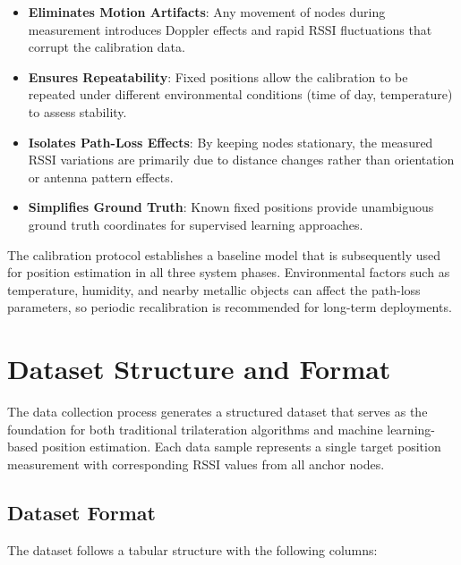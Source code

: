 \begin{itemize}
    \item \textbf{Eliminates Motion Artifacts}: Any movement of nodes during measurement introduces Doppler effects and rapid RSSI fluctuations that corrupt the calibration data.
    
    \item \textbf{Ensures Repeatability}: Fixed positions allow the calibration to be repeated under different environmental conditions (time of day, temperature) to assess stability.
    
    \item \textbf{Isolates Path-Loss Effects}: By keeping nodes stationary, the measured RSSI variations are primarily due to distance changes rather than orientation or antenna pattern effects.
    
    \item \textbf{Simplifies Ground Truth}: Known fixed positions provide unambiguous ground truth coordinates for supervised learning approaches.
\end{itemize}

The calibration protocol establishes a baseline model that is subsequently used for position estimation in all three system phases. Environmental factors such as temperature, humidity, and nearby metallic objects can affect the path-loss parameters, so periodic recalibration is recommended for long-term deployments.




\section{Dataset Structure and Format}
\label{sec:dataset_structure}

The data collection process generates a structured dataset that serves as the foundation for both traditional trilateration algorithms and machine learning-based position estimation. Each data sample represents a single target position measurement with corresponding RSSI values from all anchor nodes.

\subsection{Dataset Format}

The dataset follows a tabular structure with the following columns:

